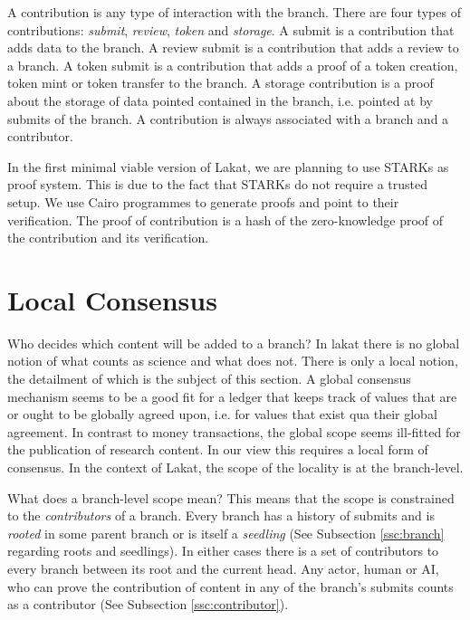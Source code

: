 \documentclass[14pt]{article}
\begin{document}
A contribution is any type of interaction with the branch. There are four types of contributions: \textit{submit}, \textit{review}, \textit{token} and \textit{storage}. A submit is a contribution that adds data to the branch. A review submit is a contribution that adds a review to a branch. A token submit is a contribution that adds a proof of a token creation, token mint or token transfer to the branch. A storage contribution is a proof about the storage of data pointed contained in the branch, i.e. pointed at by submits of the branch. A contribution is always associated with a branch and a contributor. 

In the first minimal viable version of Lakat, we are planning to use STARKs \cite{} as proof system. This is due to the fact that STARKs do not require a trusted setup. We use Cairo programmes to generate proofs and point to their verification. The proof of contribution is a hash of the zero-knowledge proof of the contribution and its verification.


\section{Local Consensus}
\label{ssc:localconsensus}

Who decides which content will be added to a branch? In lakat there is no global notion of what counts as science and what does not. There is only a local notion, the detailment of which is the subject of this section. A global consensus mechanism seems to be a good fit for a ledger that keeps track of values that are or ought to be globally agreed upon, i.e. for values that exist qua their global agreement. In contrast to money transactions, the global scope seems ill-fitted for the publication of research content. In our view this requires a local form of consensus. In the context of Lakat, the scope of the locality is at the branch-level. 

What does a branch-level scope mean? This means that the scope is constrained to the \textit{contributors} of a branch. Every branch has a history of submits and is \textit{rooted} in some parent branch or is itself a \textit{seedling} (See Subsection \ref{ssc:branch} regarding roots and seedlings). In either cases there is a set of contributors to every branch between its root and the current head. Any actor, human or AI, who can prove the contribution of content in any of the branch's submits counts as a contributor (See Subsection \ref{ssc:contributor}). 
\end{document}
